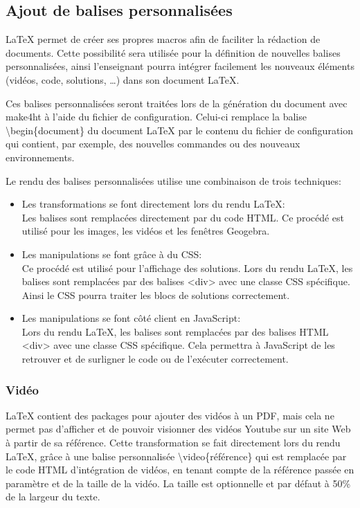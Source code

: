\documentclass[12pt,titlepage,oneside]{article}
\begin{document}
\subsection{Ajout de balises personnalisées}
LaTeX permet de créer ses propres macros afin de faciliter la rédaction de documents. Cette possibilité sera utilisée pour la définition de nouvelles balises personnalisées, ainsi l'enseignant pourra intégrer facilement les nouveaux éléments (vidéos, code, solutions, \dots) dans son document LaTeX.\par
Ces balises personnalisées seront traitées lors de la génération du document avec make4ht à l'aide du fichier de configuration. Celui-ci remplace la balise \textbackslash begin\{document\} du document LaTeX par le contenu du fichier de configuration qui contient, par exemple, des nouvelles commandes ou des nouveaux environnements.\par
Le rendu des balises personnalisées utilise une combinaison de trois techniques:
\begin{itemize}
\item Les transformations se font directement lors du rendu LaTeX:\\
Les balises sont remplacées directement par du code HTML. Ce procédé est utilisé pour les images, les vidéos et les fenêtres Geogebra.
\item Les manipulations se font grâce à du CSS:\\
Ce procédé est utilisé pour l'affichage des solutions. Lors du rendu LaTeX, les balises sont remplacées par des balises <div> avec une classe CSS spécifique. Ainsi le CSS pourra traiter les blocs de solutions correctement.
\item Les manipulations se font côté client en JavaScript:\\
Lors du rendu LaTeX, les balises sont remplacées par des balises HTML <div> avec une classe CSS spécifique. Cela permettra à JavaScript de les retrouver et de surligner le code ou de l'exécuter correctement.
\end{itemize}

\subsubsection{Vidéo}
LaTeX contient des packages pour ajouter des vidéos à un PDF, mais cela ne permet pas d'afficher et de pouvoir visionner des vidéos Youtube sur un site Web à partir de sa référence. Cette transformation se fait directement lors du rendu LaTeX, grâce à une balise personnalisée \textbackslash video\{référence\} qui est remplacée par le code HTML d'intégration de vidéos, en tenant compte de la référence passée en paramètre et de la taille de la vidéo. La taille est optionnelle et par défaut à 50\% de la largeur du texte.\par
\end{document}
